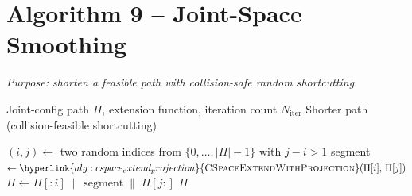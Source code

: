 \documentclass[11pt]{article}
\newcommand{\chg}[1]{\textcolor{blue}{#1}}
\newcommand{\AlgTarget}[1]{\hypertarget{#1}{}}
\newcommand{\AlgLink}[2]{\hyperlink{#1}{#2}}
\begin{document}
\section*{Algorithm 9 -- Joint-Space Smoothing}
\noindent\textit{Purpose: shorten a feasible path with collision-safe random shortcutting.}
\AlgTarget{alg:joint_space_smooth}
\begin{algorithm}[H]
\caption{\textsc{JointSpaceSmooth}($\Pi,\, \textsc{ExtendFn},\, N_{\text{iter}}$)}
\begin{algorithmic}[1]
\Require Joint-config path $\Pi$, extension function, iteration count $N_{\text{iter}}$
\Ensure  Shorter path (collision-feasible shortcutting)

  \State $(i, j) \gets$ two random indices from $\{0,\ldots,|\Pi|-1\}$ with $j - i > 1$
  \State segment $\gets \AlgLink{alg:cspace_extend_projection}{\textsc{CSpaceExtendWithProjection}}(\Pi[i],\, \Pi[j])$
  \If{\chg{segment is valid and all intermediate states pass collision}}
    \State $\Pi \gets \Pi[:i] \;\|\; \text{segment} \;\|\; \Pi[j:]$
  \EndIf
\EndFor
\State \Return $\Pi$
\end{algorithmic}
\end{algorithm}

\end{document}
